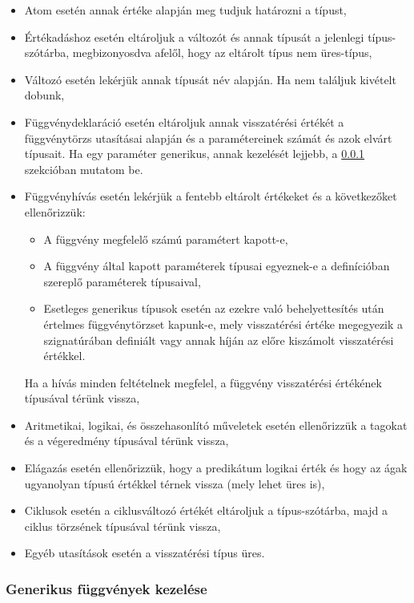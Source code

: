 \begin{itemize}
    \item Atom esetén annak értéke alapján meg tudjuk határozni a típust,
    \item Értékadáshoz esetén eltároljuk a változót és annak típusát a jelenlegi típus-szótárba, megbizonyosdva afelől, hogy az eltárolt típus nem üres-típus,
    \item Változó esetén lekérjük annak típusát név alapján. Ha nem találjuk kivételt dobunk,
    \item Függvénydeklaráció esetén eltároljuk annak visszatérési értékét a függvénytörzs utasításai alapján és a paramétereinek számát és azok elvárt típusait. Ha egy paraméter generikus, annak kezelését lejjebb, a \ref{sec:generic} szekcióban mutatom be.
    \item Függvényhívás esetén lekérjük a fentebb eltárolt értékeket és a következőket ellenőrizzük:
    \begin{itemize}
        \item A függvény megfelelő számú paramétert kapott-e,
        \item A függvény által kapott paraméterek típusai egyeznek-e a definícióban szereplő paraméterek típusaival,
        \item Esetleges generikus típusok esetén az ezekre való behelyettesítés után értelmes függvénytörzset kapunk-e, mely visszatérési értéke megegyezik a szignatúrában definiált vagy annak híján az előre kiszámolt visszatérési értékkel.
    \end{itemize}
    Ha a hívás minden feltételnek megfelel, a függvény visszatérési értékének típusával térünk vissza,
    \item Aritmetikai, logikai, és összehasonlító műveletek esetén ellenőrizzük a tagokat és a végeredmény típusával térünk vissza,
    \item Elágazás esetén ellenőrizzük, hogy a predikátum logikai érték és hogy az ágak ugyanolyan típusú értékkel térnek vissza (mely lehet üres is),
    \item Ciklusok esetén a ciklusváltozó értékét eltároljuk a típus-szótárba, majd a ciklus törzsének típusával térünk vissza,
    \item Egyéb utasítások esetén a visszatérési típus üres. 
\end{itemize}

\subsubsection{Generikus függvények kezelése}
\label{sec:generic}

